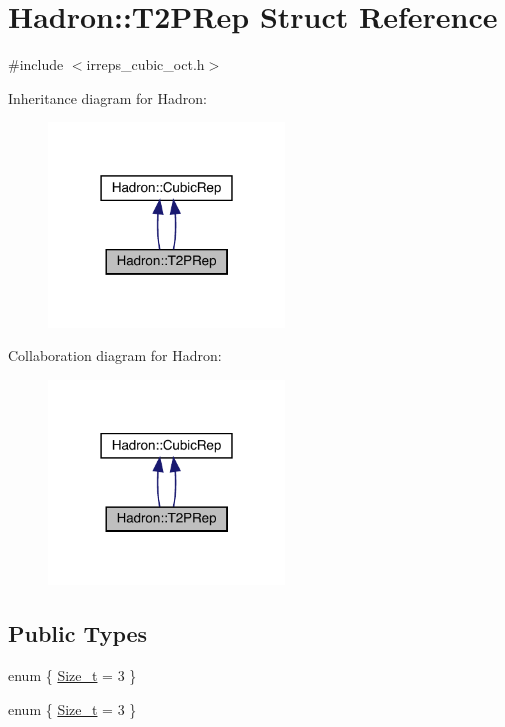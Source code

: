\hypertarget{structHadron_1_1T2PRep}{}\section{Hadron\+:\+:T2\+P\+Rep Struct Reference}
\label{structHadron_1_1T2PRep}


{\ttfamily \#include $<$irreps\+\_\+cubic\+\_\+oct.\+h$>$}



Inheritance diagram for Hadron\+:\nopagebreak
\begin{figure}[H]
\begin{center}
\leavevmode
\includegraphics[width=178pt]{dc/d95/structHadron_1_1T2PRep__inherit__graph}
\end{center}
\end{figure}


Collaboration diagram for Hadron\+:\nopagebreak
\begin{figure}[H]
\begin{center}
\leavevmode
\includegraphics[width=178pt]{d9/da2/structHadron_1_1T2PRep__coll__graph}
\end{center}
\end{figure}
\subsection*{Public Types}
\begin{DoxyCompactItemize}
\item 
enum \{ \mbox{\hyperlink{structHadron_1_1T2PRep_ad2f205e101e724e1834369b667336f0cad73baac7e5ae922d59fe2eab63d434e5}{Size\+\_\+t}} = 3
 \}
\item 
enum \{ \mbox{\hyperlink{structHadron_1_1T2PRep_ad2f205e101e724e1834369b667336f0cad73baac7e5ae922d59fe2eab63d434e5}{Size\+\_\+t}} = 3
 \}
\end{DoxyCompactItemize}
